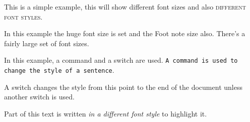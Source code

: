 \documentclass{article}
\begin{document}
	This is a simple example, {\tiny this will show different font sizes} and also \textsc{different font styles}.
	
	In this example the {\huge huge font size} is set and 
	the {\footnotesize Foot note size also}. There's a fairly 
	large set of font sizes.
	
	In this example, a command and a switch are used. 
	\texttt{A command is used to change the style 
		of a sentence}.
	
	\sffamily
	A switch changes the style from this point to 
	the end of the document unless another switch is used.
	
	Part of this text is written \textsl{in a different 
		font style} to highlight it.
		
		
\end{document}
